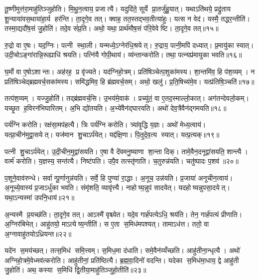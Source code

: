 तू॒ष्णीमुत्त॑रा॒माहु॑तिञ्जुहोति। मि॒थु॒न॒त्वाय॒ प्रजात्यै। यदुदि॑ते॒ सूर्ये प्रा॒तर्जु॑हु॒यात्। यथाऽति॑थये॒ प्रद्रु॑ताय शू॒न्याया॑वस॒थाया॑हा॒र्य हर॑न्ति। ता॒दृगे॒व तत्। क्वाह॒ तत॒स्तद्भव॒तीत्या॑हुः। यत्स न वेद॑। यस्मै॒ तद्धर॒न्तीति॑। तस्मा॒द्यदौ॑ष॒सं जु॒होति॑। तदे॒व सं॑प्र॒ति। अथो॒ यथा॒ प्रार्थ॑मौष॒सं प॑रि॒वेवेष्टि। ता॒दृगे॒व तत्॥१५॥\anuvakamend[अ॒मृ॒ष्ट॒ वि॒चि॒कित्स॑ति॒ जुह्व॑त्य॒जाम॑सृजताग्निहो॒त्र सूर्या॑य प्रा॒तर्जु॒होति॒ जुह्व॑ति सं॒पद्ये॑ते हूयते स्थापयति संप्र॒ति द्वे च॑]

रु॒द्रो वा ए॒षः। यद॒ग्निः। पत्नी स्था॒ली। यन्मध्ये॒ऽग्नेर॑धि॒श्रयेत्। रु॒द्राय॒ पत्नी॒मपि॑ दध्यात्। प्र॒मायु॑का स्यात्। उदी॒चोऽङ्गा॑रान्नि॒रूह्याधि॑ श्रयति। पत्नि॑यै गोपी॒थाय॑। व्य॑न्तान्करोति। तथा॒ पत्न्यप्र॑मायुका भवति॥१६॥

घ॒र्मो वा ए॒षोऽशान्तः। अह॑रह॒ प्र वृ॑ज्यते। यद॑ग्निहो॒त्रम्। प्रति॑षिञ्चेत्प॒शुका॑मस्य। शा॒न्तमि॑व॒ हि प॑श॒व्यम्। न प्रति॑षिञ्चेद्ब्रह्मवर्च॒सका॑मस्य। समि॑द्धमिव॒ हि ब्र॑ह्मवर्च॒सम्। अथो॒ खलु॑। प्र॒ति॒षिच्य॑मे॒व। यत्प्र॑तिषि॒ञ्चति॑॥१७॥

तत्प॑श॒व्यम्। यज्जु॒होति॑। तद्ब्र॑ह्मवर्च॒सि। उ॒भय॑मे॒वाक॑। प्रच्यु॑तं॒ वा ए॒तद॒स्माल्लो॒कात्। अग॑तन्देवलो॒कम्। यच्छृ॒त ह॒विरन॑भिघारितम्। अ॒भि द्यो॑तयति। अ॒भ्ये॑वैन॑द्घारयति। अथो॑ देव॒त्रैवैन॑द्गमयति॥१८॥

पर्य॑ग्नि करोति। रक्ष॑सा॒मप॑हत्यै। त्रिः पर्य॑ग्नि करोति। त्र्या॑वृ॒द्धि य॒ज्ञः। अथो॑ मेध्य॒त्वाय॑। यत्प्रा॒चीन॑मुद्वा॒सयेत्। यज॑मान शु॒चाऽर्प॑येत्। यद्द॑क्षि॒णा। पि॒तृ॒दे॒व॒त्य स्यात्। यत्प्र॒त्यक्॥१९॥

पत्नी शु॒चाऽर्प॑येत्। उ॒दी॒चीन॒मुद्वा॑सयति। ए॒षा वै दे॑वमनु॒ष्याणा शा॒न्ता दिक्। तामे॒वैन॒दनूद्वा॑सयति॒ शान्त्यै। वर्त्म॑ करोति। य॒ज्ञस्य॒ सन्त॑त्यै। निष्ट॑पति। उपै॒व तत्स्तृ॑णाति। च॒तुरुन्न॑यति। चतु॑ष्पादः प॒शव॑॥२०॥

प॒शूने॒वाव॑रुन्धे। सर्वान्पू॒र्णानुन्न॑यति। सर्वे॒ हि पुण्या॑ रा॒द्धाः। अ॒नूच॒ उन्न॑यति। प्र॒जाया॑ अनूचीन॒त्वाय॑। अ॒नूच्ये॒वास्य॑ प्र॒जाऽर्धु॑का भवति। संमृ॑शति॒ व्यावृ॑त्त्यै। नाहोष्य॒न्नुप॑ सादयेत्। यदहोष्यन्नुपसा॒दयेत्। यथा॒ऽन्यस्मा॑ उपनि॒धाय॑॥२१॥

अ॒न्यस्मै प्र॒यच्छ॑ति। ता॒दृगे॒व तत्। आऽस्मै॑ वृश्च्येत। यदे॒व गार्\mbox{}ह॑पत्येऽधि॒ श्रय॑ति। तेन॒ गार्\mbox{}ह॑पत्यं प्रीणाति। अ॒ग्निर॑बिभेत्। आहु॑तयो॒ माऽत्येष्य॒न्तीति॑। स ए॒ता स॒मिध॑मपश्यत्। तामाऽध॑त्त। ततो॒ वा अ॒ग्नावाहु॑तयोऽध्रियन्त॥२२॥

यदे॑न स॒मय॑च्छत्। तत्स॒मिध॑ समि॒त्त्वम्। स॒मिध॒मा द॑धाति। समे॒वैन॑य्यँच्छति। आहु॑तीना॒न्धृत्यै। अथो॑ अग्निहो॒त्रमे॒वेध्मव॑त्करोति। आहु॑तीनां॒ प्रति॑ष्ठित्यै। ब्र॒ह्म॒वा॒दिनो॑ वदन्ति। यदेका स॒मिध॑मा॒धाय॒ द्वे आहु॑ती जु॒होति॑। अथ॒ कस्या स॒मिधि॑ द्वि॒तीया॒माहु॑तिञ्जुहो॒तीति॑॥२३॥


